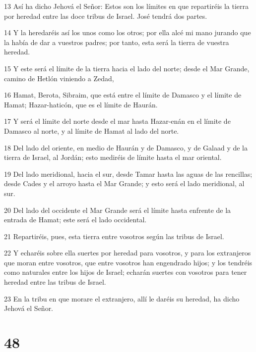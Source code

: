 \par 13 Así ha dicho Jehová el Señor: Estos son los límites en que repartiréis la tierra por heredad entre las doce tribus de Israel. José tendrá dos partes.
\par 14 Y la heredaréis así los unos como los otros; por ella alcé mi mano jurando que la había de dar a vuestros padres; por tanto, esta será la tierra de vuestra heredad.
\par 15 Y este será el límite de la tierra hacia el lado del norte; desde el Mar Grande, camino de Hetlón viniendo a Zedad,
\par 16 Hamat, Berota, Sibraim, que está entre el límite de Damasco y el límite de Hamat; Hazar-haticón, que es el límite de Haurán.
\par 17 Y será el límite del norte desde el mar hasta Hazar-enán en el límite de Damasco al norte, y al límite de Hamat al lado del norte.
\par 18 Del lado del oriente, en medio de Haurán y de Damasco, y de Galaad y de la tierra de Israel, al Jordán; esto mediréis de límite hasta el mar oriental.
\par 19 Del lado meridional, hacia el sur, desde Tamar hasta las aguas de las rencillas; desde Cades y el arroyo hasta el Mar Grande; y esto será el lado meridional, al sur.
\par 20 Del lado del occidente el Mar Grande será el límite hasta enfrente de la entrada de Hamat; este será el lado occidental.
\par 21 Repartiréis, pues, esta tierra entre vosotros según las tribus de Israel.
\par 22 Y echaréis sobre ella suertes por heredad para vosotros, y para los extranjeros que moran entre vosotros, que entre vosotros han engendrado hijos; y los tendréis como naturales entre los hijos de Israel; echarán suertes con vosotros para tener heredad entre las tribus de Israel.
\par 23 En la tribu en que morare el extranjero, allí le daréis su heredad, ha dicho Jehová el Señor.

\chapter{48}

